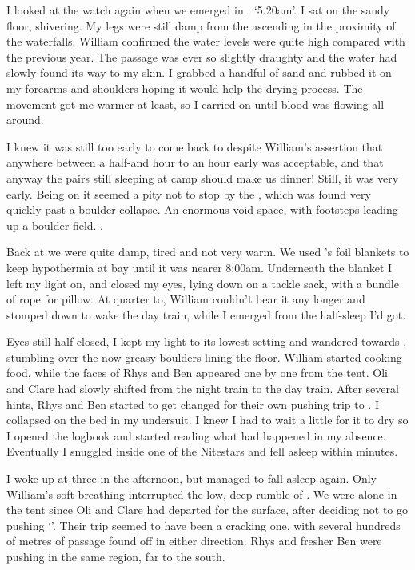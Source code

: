 I looked at the watch again when we emerged in . `5.20am'. I sat on the sandy floor, shivering. My legs were still damp from the ascending in the proximity of the waterfalls. William confirmed the water levels were quite high compared with the previous year. The passage was ever so slightly draughty and the water had slowly found its way to my skin. I grabbed a handful of sand and rubbed it on my forearms and shoulders hoping it would help the drying process. The movement got me warmer at least, so I carried on until blood was flowing all around.

I knew it was still too early to come back to  despite William's assertion that anywhere between a half-and hour to an hour early was acceptable, and that anyway the pairs still sleeping at camp should make us dinner! Still, it was very early. Being on  it seemed a pity not to stop by the , which was found very quickly past a boulder collapse. An enormous void space, with footsteps leading up a boulder field. .

Back at  we were quite damp, tired and not very warm. We used 's foil blankets to keep hypothermia at bay until it was nearer 8:00am. Underneath the blanket I left my light on, and closed my eyes, lying down on a tackle sack, with a bundle of rope for pillow. At quarter to, William couldn't bear it any longer and stomped down  to wake the day train, while I emerged from the half-sleep I'd got.

Eyes still half closed, I kept my light to its lowest setting and wandered towards , stumbling over the now greasy boulders lining the floor. William started cooking food, while the faces of Rhys and Ben appeared one by one from the tent. Oli and Clare had slowly shifted from the night train to the day train. After several hints, Rhys and Ben started to get changed for their own pushing trip to . I collapsed on the bed in my undersuit. I knew I had to wait a little for it to dry so I opened the logbook and started reading what had happened in my absence. Eventually I snuggled inside one of the Nitestars and fell asleep within minutes.

I woke up at three in the afternoon, but managed to fall asleep again. Only William's soft breathing interrupted the low, deep rumble of . We were alone in the tent since Oli and Clare had departed for the surface, after deciding not to go pushing `'. Their trip seemed to have been a cracking one, with several hundreds of metres of passage found off  in either direction. Rhys and fresher Ben were pushing in the same region, far to the south.

